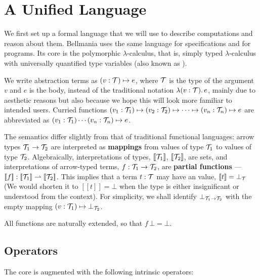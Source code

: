 \section{A Unified Language}
\label{lang}

\newcommand\semp[1]{[\![{#1}]\!]}
\newcommand\fix{\operatorname{fix}}

We first set up a formal language that we will use to describe computations and reason about them.
Bellmania uses the same language for specifications and for programs.  Its core is the polymorphic
$\lambda$-calculus, that is, simply typed $\lambda$-calculus with universally quantified type variables 
(also known as ).

We write abstraction terms as $(v:\mathcal{T})\mapsto e$, where $\mathcal{T}$ is the type of the argument $v$ and $e$ is
the body, instead of the traditional notation $\lambda(v:\mathcal{T}).\,e$, mainly due to aesthetic reasons
but also because we hope this will look more familiar to intended users.
Curried functions $(v_1:\mathcal{T}_1)\mapsto (v_2:\mathcal{T}_2) \mapsto \cdots \mapsto (v_n:\mathcal{T}_n) \mapsto e$ are abbreviated 
as $(v_1:\mathcal{T}_1)\cdots(v_n:\mathcal{T}_n)\mapsto e$.

The semantics differ slightly from that of traditional functional languages: arrow types $\mathcal{T}_1\to\mathcal{T}_2$
are interpreted as {\bf mappings} from values of type $\mathcal{T}_1$ to values of type $\mathcal{T}_2$. Algebraically,
interpretations of types, $\semp{\T_1}$, $\semp{\T_2}$, are sets, and interpretations of arrow-typed terms,
$f : \mathcal{T}_1\to\mathcal{T}_2$, are {\bf partial functions} --- $\semp{f} : \semp{\T_1}\rightharpoonup\semp{\T_2}$.
This implies that a term $t : \mathcal{T}$ may have an  value, $\semp{t}=\bot_\T$
(We would shorten it to $\semp{t}=\bot$ when the type is either insignificant or understood from the context).
For simplicity, we shall identify $\bot_{\mathcal{T}_1\to\mathcal{T}_2}$ with the empty mapping $(v:\mathcal{T}_1)\mapsto\bot_{\mathcal{T}_2}$.

All functions are naturally extended, so that $f\,\bot=\bot$.

\subsection{Operators}
\label{lang:operators}

The core is augmented with the following intrinsic operators:

